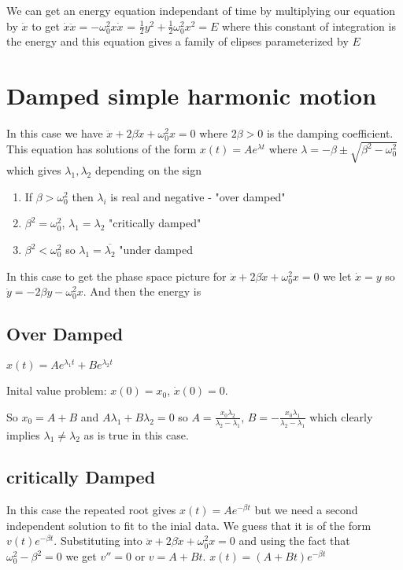 \documentclass{homework}
\begin{document}
We can get an energy equation independant of time by multiplying our equation by $\dot x$ to get $\dot x \ddot x = -\omega_0^2 x \dot x$ = $\frac{1}{2}y^2 + \frac{1}{2}\omega_0^2x^2 = E$ where this constant of integration is the energy and this equation gives a family of elipses parameterized by $E$




\section{Damped simple harmonic motion}
In this case we have $\ddot x + 2\beta \dot x + \omega_0^2 x = 0$ where $2\beta >0$ is the damping coefficient. This equation has solutions of the form $x(t) = Ae^{\lambda t}$ where $\lambda = -\beta \pm \sqrt{\beta^2 - \omega_0^2}$ which gives $\lambda_1, \lambda_2$ depending on the sign

\begin{enumerate}
    \item  If $\beta > \omega_0^2$ then $\lambda_i$ is real and negative - "over damped"
    \item $\beta^2 = \omega_0^2$, $\lambda_1 = \lambda_2$ "critically damped"
    \item $\beta^2 < \omega_0^2$ so $\lambda_1 = \overline{\lambda_2}$ "under damped
\end{enumerate}


In this case to get the phase space picture for $\ddot x + 2\beta \dot x + \omega_0^2 x = 0$ we let $\dot x = y$ so $\dot y = -2\beta y - \omega_0^2x$. And then the energy is 

\subsection{Over Damped}

$x(t) = Ae^{\lambda_1 t} + Be^{\lambda_2 t}$

Inital value problem: $x(0) = x_0$, $\dot x(0) = 0$.

So $x_0 = A + B$ and $A \lambda_1 + B \lambda_2 = 0$ so $A = \frac{x_0 \lambda_2}{\lambda_2 - \lambda_1}$, $B = -\frac{x_0 \lambda_1}{\lambda_2 - \lambda_1}$ which clearly implies $\lambda_1 \neq \lambda_2$ as is true in this case.



\subsection{critically Damped}
In this case the repeated root gives $x(t) = Ae^{-\beta t}$ but we need a second independent solution to fit to the inial data. We guess that it is of the form $v(t)e^{-\beta t}$. Substituting into $\ddot x + 2\beta \dot x + \omega_0^2 x = 0$ and using the fact that $\omega_0^2 - \beta^2 = 0$ we get $v'' = 0$ or $v = A + Bt$. 
$x(t) = (A+Bt)e^{-\beta t}$
\end{document}
